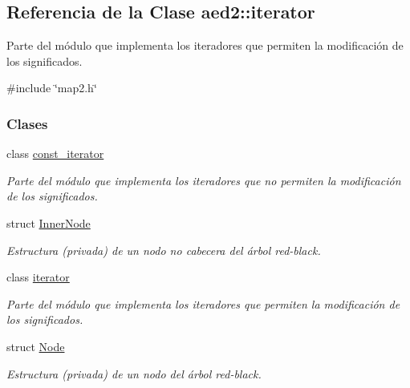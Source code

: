 \hypertarget{classaed2_1_1iterator}{}\subsection{Referencia de la Clase aed2\+:\+:iterator}
\label{classaed2_1_1iterator}


Parte del módulo que implementa los iteradores que permiten la modificación de los significados.  




{\ttfamily \#include \char`\"{}map2.\+h\char`\"{}}

\subsubsection*{Clases}
\begin{DoxyCompactItemize}
\item 
class \hyperlink{classaed2_1_1iterator_1_1const__iterator}{const\+\_\+iterator}
\begin{DoxyCompactList}\small\item\em Parte del módulo que implementa los iteradores que no permiten la modificación de los significados. \end{DoxyCompactList}\item 
struct \hyperlink{structaed2_1_1iterator_1_1InnerNode}{Inner\+Node}
\begin{DoxyCompactList}\small\item\em Estructura (privada) de un nodo no cabecera del árbol red-\/black. \end{DoxyCompactList}\item 
class \hyperlink{classaed2_1_1iterator_1_1iterator}{iterator}
\begin{DoxyCompactList}\small\item\em Parte del módulo que implementa los iteradores que permiten la modificación de los significados. \end{DoxyCompactList}\item 
struct \hyperlink{structaed2_1_1iterator_1_1Node}{Node}
\begin{DoxyCompactList}\small\item\em Estructura (privada) de un nodo del árbol red-\/black. \end{DoxyCompactList}\end{DoxyCompactItemize}
